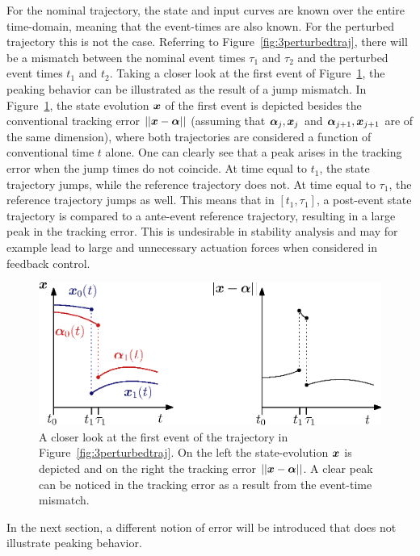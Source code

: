 \documentclass[../DC2017114Bouma.tex]{subfiles}
\begin{document}
For the nominal trajectory, the state and input curves are known over the entire time-domain, meaning that the event-times are also known. For the perturbed trajectory this is not the case. Referring to Figure~\ref{fig:3perturbedtraj}, there will be a mismatch between the nominal event times $\tau_1$ and $\tau_2$ and the perturbed event times $t_1$ and $t_2$. Taking a closer look at the first event of Figure~\ref{fig:3peakerror}, the peaking behavior can be illustrated as the result of a jump mismatch. In Figure~\ref{fig:3peakerror}, the state evolution ${\boldsymbol{x}}$ of the first event is depicted besides the conventional tracking error $||{\boldsymbol{x}}-\boldsymbol{\alpha}||$ (assuming that $\boldsymbol{\alpha}_j,{\boldsymbol{x}}_j$ and $\boldsymbol{\alpha}_{j+1},{\boldsymbol{x}}_{j+1}$ are of the same dimension), where both trajectories are considered a function of conventional time $t$ alone. One can clearly see that a peak arises in the tracking error when the jump times do not coincide. At time equal to $t_1$, the state trajectory jumps, while the reference trajectory does not. At time equal to $\tau_1$, the reference trajectory jumps as well. This means that in $[t_1,\tau_1]$, a post-event state trajectory is compared to a ante-event reference trajectory, resulting in a large peak in the tracking error. This is undesirable in stability analysis and may for example lead to large and unnecessary actuation forces when considered in feedback control.

\begin{figure}[h]
\centering
\includegraphics[width=.66\textwidth]{peakerror.eps}\caption{A closer look at the first event of the trajectory in Figure~\ref{fig:3perturbedtraj}. On the left the state-evolution ${\boldsymbol{x}}$ is depicted and on the right the tracking error $||{\boldsymbol{x}}-\boldsymbol{\alpha}||$. A clear peak can be noticed in the tracking error as a result from the event-time mismatch.} \label{fig:3peakerror}
\end{figure}

In the next section, a different notion of error will be introduced that does not illustrate peaking behavior.
%
%
%
%
%
\end{document}
